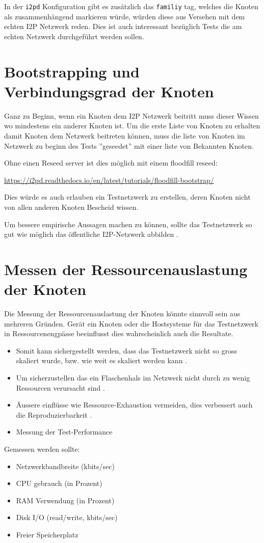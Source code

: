 In der \lstinline|i2pd| Konfiguration gibt es zusätzlich das \lstinline|familiy| tag, welches die Knoten als zusammenhängend markieren würde, würden diese aus Versehen mit dem echten I2P Netzwerk reden. Dies ist auch interessant bezüglich Tests die am echten Netzwerk durchgeführt werden sollen.


\section{Bootstrapping und Verbindungsgrad der Knoten}

Ganz zu Beginn, wenn ein Knoten dem I2P Netzwerk beitritt muss dieser Wissen wo mindestens ein anderer Knoten ist.
Um die erste Liste von Knoten zu erhalten damit Knoten dem Netzwerk beitreten können, muss die liste von Knoten im Netzwerk zu beginn des Tests ''geseedet'' mit einer liste von Bekannten Knoten.

Ohne einen Reseed server ist dies möglich mit einem floodfill reseed:

\url{https://i2pd.readthedocs.io/en/latest/tutorials/floodfill-bootstrap/}

Dies würde es auch erlauben ein Testnetzwerk zu erstellen, deren Knoten nicht von allen anderen Knoten Bescheid wissen.


Um bessere empirische Aussagen machen zu können, sollte das Testnetzwerk so gut wie möglich das öffentliche I2P-Netzwerk abbilden .


\section{Messen der Ressourcenauslastung der Knoten}

Die Messung der Ressourcenauslastung der Knoten könnte sinnvoll sein aus mehreren Gründen.
Gerät ein Knoten oder die Hostsysteme für das Testnetzwerk in Ressourcenengpässe beeinflusst dies wahrscheinlich auch die Resultate.

\begin{itemize}
    \item Somit kann sichergestellt werden, dass das Testnetzwerk nicht so gross skaliert wurde, bzw. wie weit es skaliert werden kann .
    \item Um sicherzustellen das ein Flaschenhals im Netzwerk nicht durch zu wenig Ressourcen verursacht sind .
    \item Äussere einflüsse wie Ressource-Exhaustion vermeiden, dies verbessert auch die Reproduzierbarkeit .
    \item Messung der Test-Performance
\end{itemize}

Gemessen werden sollte:

\begin{itemize}
    \item Netzwerkbandbreite (kbits/sec)
    \item CPU gebrauch (in Prozent)
    \item RAM Verwendung (in Prozent)
    \item Disk I/O (read/write, kbits/sec)
    \item Freier Speicherplatz
\end{itemize}
